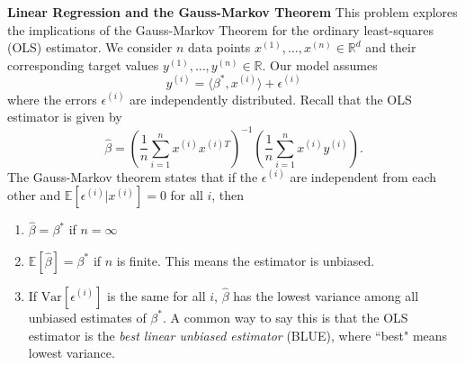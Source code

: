 \documentclass[12pt, addpoints]{exam}
\begin{document}
\begin{questions}
\question[25] \textbf{Linear Regression and the Gauss-Markov Theorem}
    This problem explores the implications of the Gauss-Markov Theorem for the ordinary least-squares (OLS) estimator. We consider $n$ data points $x^{(1)}, \ldots, x^{(n)} \in \mathbb{R}^d$ and their corresponding target values $y^{(1)}, \ldots, y^{(n)} \in \mathbb{R}$. Our model assumes
    $$
    y^{(i)} = \langle \beta^*, x^{(i)} \rangle + \epsilon^{(i)}
    $$
    where the errors $\epsilon^{(i)}$ are independently distributed. Recall that the OLS estimator is given by
    $$
    \hat{\beta} = \left(\frac{1}{n}\sum_{i = 1}^n x^{(i)} x^{(i)T}\right)^{-1} \left(\frac{1}{n}\sum_{i = 1}^n x^{(i)} y^{(i)}\right).
    $$
    The Gauss-Markov theorem states that if the $\epsilon^{(i)}$ are independent from each other and $\mathbb{E}[\epsilon^{(i)} | x^{(i)}] = 0$ for all $i$, then
    \begin{enumerate}
        \item $\hat{\beta} = \beta^*$ if $n = \infty$
        \item $\mathbb{E}[\hat{\beta}] = \beta^*$ if $n$ is finite. This means the estimator is unbiased.
        \item If $\text{Var}[\epsilon^{(i)}]$ is the same for all $i$, $\hat{\beta}$ has the lowest variance among all unbiased estimates of $\beta^*$. A common way to say this is that the OLS estimator is the \textit{best linear unbiased estimator} (BLUE), where ``best" means lowest variance.
    \end{enumerate}
\end{questions}
\end{document}
